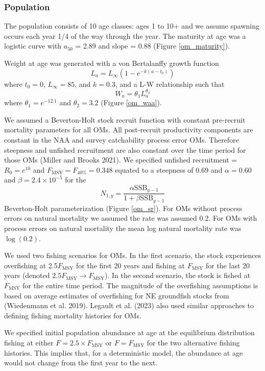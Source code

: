 \documentclass[
  12pt,
]{article}
\newcommand{\Fmsy}{\ensuremath{F_{\text{MSY}}}\xspace}
\begin{document}
\hypertarget{population}{%
\subsubsection*{Population}\label{population}}

The population consists of 10 age classes: ages 1 to 10+ and we assume
spawning occurs each year 1/4 of the way through the year. The maturity
at age was a logistic curve with \(a_{50}\) = 2.89 and slope = 0.88
(Figure \ref{om_maturity}).

Weight at age was generated with a von Bertalanffy growth function \[
L_a = L_{\infty}\left(1 - e^{-k(a - t_0)}\right)
\] where \(t_0 = 0\), \(L_\infty = 85\), and \(k = 0.3\), and a L-W
relationship such that \[
W_a = \theta_1 L_a^{\theta_2}
\] where \(\theta_1 = e^{-12.1}\) and \(\theta_2 = 3.2\) (Figure
\ref{om_waa}).

We assumed a Beverton-Holt stock recruit function with constant
pre-recruit mortality parameters for all OMs. All post-recruit
productivity components are constant in the NAA and survey catchability
process error OMs. Therefore steepness and unfished recruitment are also
constant over the time period for those OMs (Miller and Brooks 2021). We
specified unfished recruitment = \(R_0 = e^{10}\) and
\(\Fmsy = F_{40\%} = 0.348\) equated to a steepness of 0.69 and
\(\alpha=0.60\) and \(\beta = 2.4 \times 10^{-5}\) for the \[
N_{1,y} = \frac{\alpha \text{SSB}_{y-1}}{1 + \beta \text{SSB}_{y-1}} 
\] Beverton-Holt parameterization (Figure \ref{om_sr}). For OMs without
process errors on natural mortality we assumed the rate was assumed 0.2.
For OMs with process errors on natural mortality the mean log natural
mortality rate was \(\log(0.2)\).

We used two fishing scenarios for OMs. In the first scenario, the stock
experiences overfishing at 2.5\Fmsy for the first 20 years and fishing
at \Fmsy for the last 20 years (denoted \(2.5\Fmsy \rightarrow \Fmsy\)).
In the second scenario, the stock is fished at \Fmsy for the entire time
period. The magnitude of the overfishing assumptions is based on average
estimates of overfishing for NE groundfish stocks from (Wiedenmann et
al. 2019). Legault et al. (2023) also used similar approaches to
defining fishing mortality histories for OMs.

We specified initial population abundance at age at the equilibrium
distribution fishing at either \(F = 2.5\times \Fmsy\) or \(F = \Fmsy\)
for the two alternative fishing histories. This implies that, for a
deterministic model, the abundance at age would not change from the
first year to the next.
\end{document}
